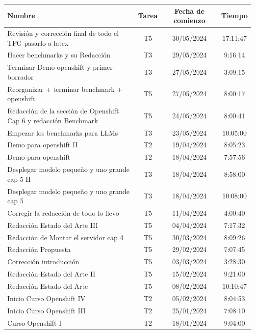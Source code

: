 \newpage
    \begin{table}[H]
        \centering
        \begin{tabular}{|p{6cm}|c|c|c|}
            \hline
            \textbf{Nombre} & \textbf{Tarea} & \textbf{Fecha de comienzo} & \textbf{Tiempo} \\
            \hline
            Revisión y corrección final de todo el TFG pasarlo a latex & T5 & 30/05/2024 & 17:11:47 \\
            Hacer benchmarks y su Redacción & T3 & 29/05/2024 & 9:16:14 \\
            Terminar Demo openshift y primer borrador & T3 & 27/05/2024 & 3:09:15 \\
            Reorganizar + terminar benchmark + openshift & T5 & 27/05/2024 & 8:00:17 \\
            Redacción de la sección de Openshift Cap 6 y redacción Benchmark & T5 & 24/05/2024 & 8:00:41 \\
            Empezar los benchmarks para LLMs & T3 & 23/05/2024 & 10:05:00 \\
            Demo para openshift II & T2 & 19/04/2024 & 8:05:23 \\
            Demo para openshift & T2 & 18/04/2024 & 7:57:56 \\
            Desplegar modelo pequeño y uno grande cap 5 II & T3 & 18/04/2024 & 8:58:00 \\
            Desplegar modelo pequeño y uno grande cap 5 & T3 & 18/04/2024 & 10:08:00 \\
            Corregir la redacción de todo lo llevo & T5 & 11/04/2024 & 4:00:40 \\
            Redacción Estado del Arte III & T5 & 04/04/2024 & 7:17:32 \\
            Redacción de Montar el servidor cap 4 & T5 & 30/03/2024 & 8:09:26 \\
            Redacción Propuesta & T5 & 29/02/2024 & 7:07:45 \\
            Corrección introducción & T5 & 03/03/2024 & 3:28:30 \\
            Redacción Estado del Arte II & T5 & 15/02/2024 & 9:21:00 \\
            Redacción Estado del Arte & T5 & 08/02/2024 & 10:10:47 \\
            Inicio Curso Openshift IV & T2 & 05/02/2024 & 8:04:53 \\
            Inicio Curso Openshift III & T2 & 25/01/2024 & 7:08:10 \\
            Curso Openshift I & T2 & 18/01/2024 & 9:04:00 \\

\end{tabular}
\end{table}

